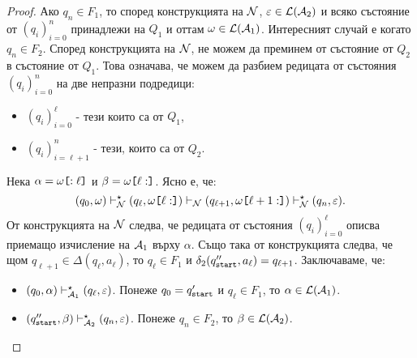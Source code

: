 \begin{proof}
  Ако $q_n \in F_1$, то според конструкцията на $\mathcal{N}$, $\varepsilon \in \mathcal{L}(\mathcal{A}_2)$ и всяко състояние от $(q_i)^{n}_{i=0}$ принадлежи на $Q_1$ и оттам $\omega \in \mathcal{L}(\mathcal{A}_1)$.
  Интересният случай е когато $q_n \in F_2$.
  Според конструкцията на $\mathcal{N}$, не можем да преминем от състояние от $Q_2$ в състояние от $Q_1$.
  Това означава, че можем да разбием редицата от състояния $(q_i)^n_{i=0}$ на две непразни подредици:
  \begin{itemize}
  \item
    $(q_{i})^{\ell}_{i=0}$ - тези които са от $Q_1$,
  \item
    $(q_i)^{n}_{i=\ell+1}$ - тези, които са от $Q_2$.
  \end{itemize}
  Нека $\alpha = \omega\texttt{[}{:\ell}\texttt{]}$ и $\beta = \omega\texttt{[}{\ell:}\texttt{]}$.
  Ясно е, че:
  \[(q_0,\omega) \vdash^\star_{\mathcal{N}} (q_{\ell}, \omega\texttt{[}{\ell:}\texttt{]}) \vdash_{\mathcal{N}} (q_{\ell+1},\omega\texttt{[}{\ell+1:}\texttt{]}) \vdash^\star_{\mathcal{N}} (q_n,\varepsilon).\]
  От конструкцията на $\mathcal{N}$ следва, че редицата от състояния $(q_i)^{\ell}_{i=0}$ описва приемащо изчисление на $\mathcal{A}_1$ върху $\alpha$.
  Също така от конструкцията следва, че щом $q_{\ell+1} \in \Delta(q_\ell,a_\ell)$, то $q_{\ell} \in F_1$ и $\delta_2(q_{\texttt{start}}'',a_\ell) = q_{\ell+1}$. Заключаваме, че:
  \begin{itemize}
  \item
    $(q_0, \alpha) \vdash^\star_{\mathcal{A}_1} (q_\ell,\varepsilon)$.
    Понеже $q_0 = q_{\texttt{start}}'$ и $q_\ell \in F_1$, то $\alpha \in \mathcal{L}(\mathcal{A}_1)$.
  \item
    $(q_{\texttt{start}}'', \beta) \vdash^\star_{\mathcal{A}_2} (q_n,\varepsilon)$.
    Понеже $q_n \in F_2$, то $\beta \in \mathcal{L}(\mathcal{A}_2)$.
  \end{itemize}
\end{proof}

